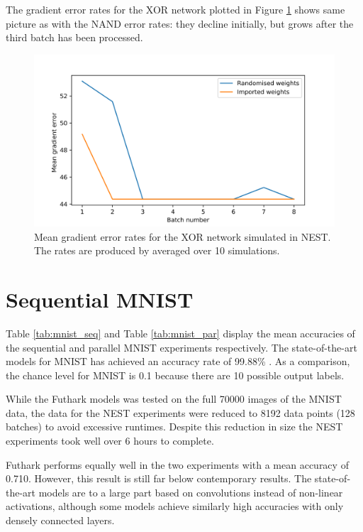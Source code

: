 \documentclass[report.tex]{subfiles}
\begin{document}
The gradient error rates for the XOR network plotted in Figure \ref{fig:xor_snn} shows
same picture as with the NAND error rates: they decline initially, but grows
after the third batch has been processed.

\begin{figure}
  \includegraphics[width=\linewidth]{images/xor.png}
  \caption{Mean gradient error rates for the XOR network simulated in NEST. The rates
  are produced by averaged over 10 simulations.}
  \label{fig:xor_snn}
\end{figure}

\FloatBarrier

\section{Sequential MNIST}
Table \ref{tab:mnist_seq} and Table \ref{tab:mnist_par} display the mean
accuracies of the sequential and parallel MNIST experiments respectively.
The state-of-the-art models for MNIST has achieved an accuracy rate of 99.88\%
\cite{LeCun2019}.
As a comparison, the chance level for MNIST is 0.1 because there are 10 possible output labels.

While the Futhark models was tested on the full
70000 images of the MNIST data, the data for the NEST experiments were reduced to 
8192 data points (128 batches) to avoid excessive runtimes.
Despite this reduction in size the NEST experiments took
well over 6 hours to complete.

Futhark performs equally well in the two experiments with a mean accuracy of
0.710. 
However, this result is still far below contemporary results.
The state-of-the-art models are to a large part based on convolutions instead of
non-linear activations, although some models achieve similarly high accuracies
with only densely connected layers.
\end{document}
